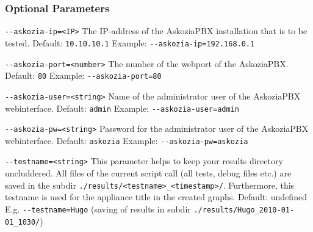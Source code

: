 \subsubsection{Optional Parameters}%
\begin{description}

\item {\texttt{-{}-askozia-ip=<IP>}} \newline
The IP-address of the AskoziaPBX installation that is to be tested.
\newline Default: \texttt{10.10.10.1}
\newline Example: \texttt{-{}-askozia-ip=192.168.0.1}

\item {\texttt{-{}-askozia-port=<number>}} \newline
The number of the webport of the AskoziaPBX.
\newline Default: \texttt{80}
\newline Example: \texttt{-{}-askozia-port=80}

\item {\texttt{-{}-askozia-user=<string>}} \newline
Name of the administrator user of the AskoziaPBX webinterface.
\newline Default: \texttt{admin}
\newline Example: \texttt{-{}-askozia-user=admin}

\item {\texttt{-{}-askozia-pw=<string>}} \newline
Password for the administrator user of the AskoziaPBX webinterface.
\newline Default: \texttt{askozia}
\newline Example: \texttt{-{}-askozia-pw=askozia}

\item {\texttt{-{}-testname=<string>}} \newline
This parameter helps to keep your results directory uncluddered. All files of the
current script call (all tests, debug files etc.) are saved in the subdir \newline
\texttt{./results/<testname>\_<timestamp>/}. Furthermore, this testname is used
for the appliance title in the created graphs.
\newline Default: undefined
\newline E.g. \texttt{-{}-testname=Hugo}
\newline (saving of results in subdir \texttt{./results/Hugo\_2010-01-01\_1030/})


\end{description}
